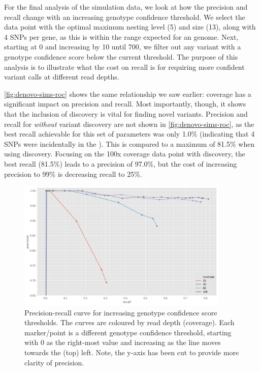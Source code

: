 For the final analysis of the simulation data, we look at how the precision and recall change with an increasing genotype confidence threshold. We select the data point with the optimal maximum nesting level (5) and \denovo{} \kmer{} size (13), along with 4 SNPs per gene, as this is within the range expected for an \ecoli{} genome. Next, starting at 0 and increasing by 10 until 700, we filter out any variant with a genotype confidence score below the current threshold. The purpose of this analysis is to illustrate what the cost on recall is for requiring more confident variant calls at different read depths.

\autoref{fig:denovo-sims-roc} shows the same relationship we saw earlier: coverage has a significant impact on precision and recall. Most importantly, though, it shows that the inclusion of \denovo{} discovery is vital for finding novel variants. Precision and recall for \pandora{} \emph{without} variant discovery are not shown in \autoref{fig:denovo-sims-roc}, as the best recall achievable for this set of parameters was only 1.0\% (indicating that 4 SNPs were incidentally in the \panrg{}). This is compared to a maximum of 81.5\% when using \denovo{} discovery. Focusing on the 100x coverage data point with \denovo{} discovery, the best recall (81.5\%) leads to a precision of 97.0\%, but the cost of increasing precision to 99\% is decreasing recall to 25\%. 

\begin{figure}
    \centering
    \includegraphics[width=0.9\textwidth]{Chapter1/Figs/denovo-sims-roc.png}
    \caption{Precision-recall curve for increasing genotype confidence score thresholds. The curves are coloured by read depth (coverage). Each marker/point is a different genotype confidence threshold, starting with 0 as the right-most value and increasing as the line moves towards the (top) left. Note, the y-axis has been cut to provide more clarity of precision.}
    \label{fig:denovo-sims-roc}
\end{figure}

